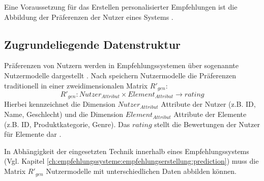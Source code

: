 Eine Voraussetzung für das Erstellen personalisierter Empfehlungen ist die Abbildung der Präferenzen der Nutzer eines Systems \cite[S. 36]{berkovsky:2:article}.

\subsection{Zugrundeliegende Datenstruktur}%
\label{ch:empfehlungssysteme:preferences:data}
Präferenzen von Nutzern werden in Empfehlungssystemen über sogenannte Nutzermodelle dargestellt \cite[S. 246]{berkovsky:article}\cite[S. 2]{jawaheer:article}\cite[S. 9]{ricci:inbook}.
Nach \textcite[S. 249f.]{berkovsky:article} speichern Nutzermodelle die Präferenzen traditionell in einer zweidimensionalen Matrix $R'_{gen}$:
\begin{equation}\label{eq4}
    R'_{gen}: Nutzer_{Attribut} \times Element_{Attribut} \rightarrow rating
\end{equation}
Hierbei kennzeichnet die Dimension $Nutzer_{Attribut}$ Attribute der Nutzer (z.B. ID, Name, Geschlecht) und die Dimension $Element_{Attribut}$ Attribute der Elemente (z.B. ID, Produktkategorie, Genre).
Das $rating$ stellt die Bewertungen der Nutzer für Elemente dar \cite[S. 250]{berkovsky:article}.

In Abhängigkeit der eingesetzten Technik innerhalb eines Empfehlungssystems (Vgl. Kapitel \ref{ch:empfehlungssysteme:empfehlungserstellung:prediction}) muss die Matrix $R'_{gen}$ Nutzermodelle mit unterschiedlichen Daten abbilden können. %

